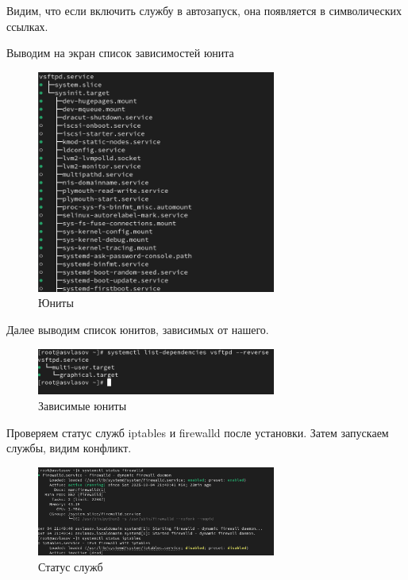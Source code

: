 \documentclass[
  12pt,
  a4paper,
  DIV=11,
  numbers=noendperiod]{scrreprt}
\begin{document}
Видим, что если включить службу в автозапуск, она появляется в
символических ссылках.

Выводим на экран список зависимостей юнита

\begin{figure}

{\centering \includegraphics[width=0.7\textwidth,height=\textheight]{image/5.png}

}

\caption{Юниты}

\end{figure}%

Далее выводим список юнитов, зависимых от нашего.

\begin{figure}

{\centering \includegraphics[width=0.7\textwidth,height=\textheight]{image/6.png}

}

\caption{Зависимые юниты}

\end{figure}%

Проверяем статус служб iptables и firewalld после установки. Затем
запускаем службы, видим конфликт.

\begin{figure}

{\centering \includegraphics[width=0.7\textwidth,height=\textheight]{image/7.png}

}

\caption{Статус служб}

\end{figure}%
\end{document}

